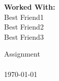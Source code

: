 \documentclass[11pt]{article}
\begin{document}
\thispagestyle{plain}
\begin{flushright}
  \textbf{Worked With:}\\
  Best Friend1\\
  Best Friend2\\
  Best Friend3\\
\end{flushright}

\begin{center}                                      %
  {\Large \myclass Assignment \myhwnum} \\
  \myemail\\
  \today\\
\end{center}
\end{document}
